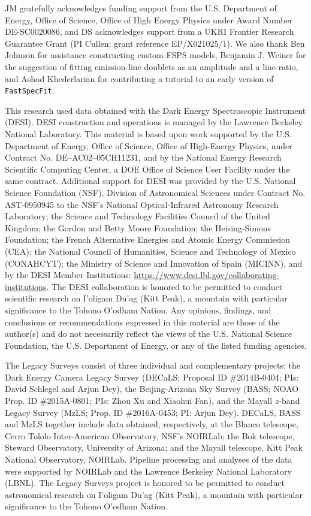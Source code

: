 \documentclass[modern,linenumbers]{aastex702}
\newcommand{\fastspecfit}{\texttt{FastSpecFit}}
\begin{document}
\begin{acknowledgements}
JM gratefully acknowledges funding support from the U.S. Department of
Energy, Office of Science, Office of High Energy Physics under Award
Number DE-SC0020086, and DS acknowledges support from a UKRI Frontier
Research Guarantee Grant (PI Cullen; grant reference EP/X021025/1). We
also thank Ben Johnson for assistance constructing custom FSPS models,
Benjamin J. Weiner for the suggestion of fitting emission-line
doublets as an amplitude and a line-ratio, and Ashod Khederlarian for
contributing a tutorial to an early version of \fastspecfit.

This research used data obtained with the Dark Energy Spectroscopic
Instrument (DESI). DESI construction and operations is managed by the
Lawrence Berkeley National Laboratory. This material is based upon
work supported by the U.S. Department of Energy, Office of Science,
Office of High-Energy Physics, under Contract No. DE–AC02–05CH11231,
and by the National Energy Research Scientific Computing Center, a DOE
Office of Science User Facility under the same contract. Additional
support for DESI was provided by the U.S. National Science Foundation
(NSF), Division of Astronomical Sciences under Contract
No. AST-0950945 to the NSF’s National Optical-Infrared Astronomy
Research Laboratory; the Science and Technology Facilities Council of
the United Kingdom; the Gordon and Betty Moore Foundation; the
Heising-Simons Foundation; the French Alternative Energies and Atomic
Energy Commission (CEA); the National Council of Humanities, Science
and Technology of Mexico (CONAHCYT); the Ministry of Science and
Innovation of Spain (MICINN), and by the DESI Member Institutions:
\url{https://www.desi.lbl.gov/collaborating-institutions}. The DESI
collaboration is honored to be permitted to conduct scientific
research on I’oligam Du’ag (Kitt Peak), a mountain with particular
significance to the Tohono O’odham Nation. Any opinions, findings, and
conclusions or recommendations expressed in this material are those of
the author(s) and do not necessarily reflect the views of the
U.S. National Science Foundation, the U.S. Department of Energy, or
any of the listed funding agencies.

The Legacy Surveys consist of three individual and complementary
projects: the Dark Energy Camera Legacy Survey (DECaLS; Proposal ID
\#2014B-0404; PIs: David Schlegel and Arjun Dey), the Beijing-Arizona
Sky Survey (BASS; NOAO Prop. ID \#2015A-0801; PIs: Zhou Xu and Xiaohui
Fan), and the Mayall $z$-band Legacy Survey (MzLS; Prop. ID
\#2016A-0453; PI: Arjun Dey). DECaLS, BASS and MzLS together include
data obtained, respectively, at the Blanco telescope, Cerro Tololo
Inter-American Observatory, NSF’s NOIRLab; the Bok telescope, Steward
Observatory, University of Arizona; and the Mayall telescope, Kitt
Peak National Observatory, NOIRLab. Pipeline processing and analyses
of the data were supported by NOIRLab and the Lawrence Berkeley
National Laboratory (LBNL). The Legacy Surveys project is honored to
be permitted to conduct astronomical research on I’oligam Du’ag (Kitt
Peak), a mountain with particular significance to the Tohono O’odham
Nation.


\end{acknowledgements}
\end{document}

